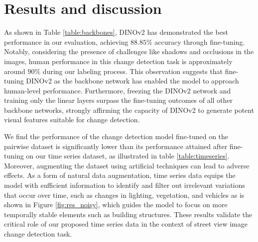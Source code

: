 \documentclass[letterpaper]{article} %
\begin{document}



\section{Results and discussion}
As shown in Table \ref{table:backbones}, DINOv2 has demonstrated the best performance in our evaluation, achieving $88.85\%$ accuracy through fine-tuning. Notably, considering the presence of challenges like shadows and occlusions in the images, human performance in this change detection task is approximately around $90\%$ during our labeling process. This observation suggests that fine-tuning DINOv2 as the backbone network has enabled the model to approach human-level performance. Furthermore, freezing the DINOv2 network and training only the linear layers surpass the fine-tuning outcomes of all other backbone networks, strongly affirming the capacity of DINOv2 to generate potent visual features suitable for change detection.

We find the performance of the change detection model fine-tuned on the pairwise dataset is significantly lower than its performance attained after fine-tuning on our time series dataset, as illustrated in table \ref{table:timeseries}.
Moreover, augmenting the dataset using artificial techniques can lead to adverse effects.
As a form of natural data augmentation, time series data equips the model with sufficient information to identify and filter out irrelevant variations that occur over time, such as changes in lighting, vegetation, and vehicles as is shown in Figure \ref{fig:res_noisy}, which guides the model to focus on more temporally stable elements such as building structures. These results validate the critical role of our proposed time series data in the context of street view image change detection task.
\end{document}
